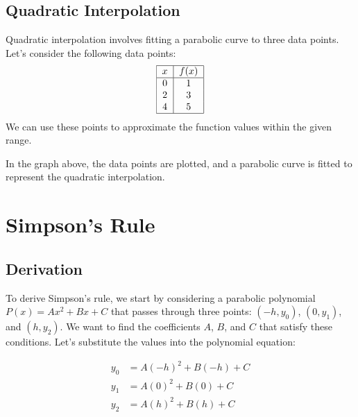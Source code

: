 \documentclass[a4paper]{article}
\begin{document}
\subsection{Quadratic Interpolation}
Quadratic interpolation involves fitting a parabolic curve to three data points. Let's consider the following data points:
\[
\begin{tabular}{|c|c|}
\hline
$x$ & $f(x)$ \\
\hline
0 & 1 \\
2 & 3 \\
4 & 5 \\
\hline
\end{tabular}
\]
We can use these points to approximate the function values within the given range.

\begin{center}
\end{center}

In the graph above, the data points are plotted, and a parabolic curve is fitted to represent the quadratic interpolation.

\section{Simpson's Rule}

\subsection{Derivation}

To derive Simpson's rule, we start by considering a parabolic polynomial $P(x) = Ax^2 + Bx + C$ that passes through three points: $(-h, y_0)$, $(0, y_1)$, and $(h, y_2)$. We want to find the coefficients $A$, $B$, and $C$ that satisfy these conditions. Let's substitute the values into the polynomial equation:

\[
\begin{aligned}
y_0 &= A(-h)^2 + B(-h) + C \\
y_1 &= A(0)^2 + B(0) + C \\
y_2 &= A(h)^2 + B(h) + C \\
\end{aligned}
\]
\end{document}
